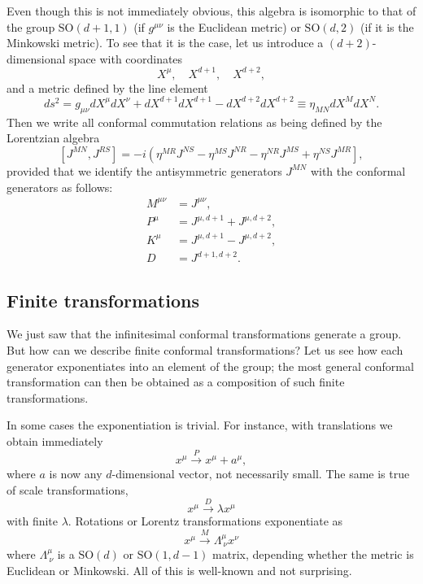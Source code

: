 \documentclass[a4paper,12pt]{article}
\numberwithin{equation}{section}
\begin{document}
Even though this is not immediately obvious, this algebra is isomorphic to that of the group $\text{SO}(d+1, 1)$ (if $g^{\mu\nu}$ is the Euclidean metric) or $\text{SO}(d, 2)$ (if it is the Minkowski metric).
To see that it is the case, let us introduce a $(d + 2)$-dimensional space with coordinates
\begin{equation}
	X^\mu, \quad X^{d+1}, \quad X^{d+2},
\end{equation}
and a metric defined by the line element
\begin{equation}
	ds^2 = g_{\mu\nu} dX^\mu dX^\nu + dX^{d+1} dX^{d+1}
	- dX^{d+2} dX^{d+2}
	\equiv \eta_{MN} dX^M dX^N.
\end{equation}
Then we write all conformal commutation relations as being defined by the Lorentzian algebra
\begin{equation}
	\left[ J^{MN}, J^{RS} \right]
	= -i \left( \eta^{MR} J^{NS} - \eta^{MS} J^{NR}
	- \eta^{NR} J^{MS} + \eta^{NS} J^{MR} \right],
\end{equation}
provided that we identify the antisymmetric generators $J^{MN}$ with the conformal generators as follows:
\begin{equation}
\begin{aligned}
	M^{\mu\nu} &= J^{\mu\nu},
	\\
	P^\mu &= J^{\mu, d+1} + J^{\mu, d+2},
	\\
	K^\mu &= J^{\mu, d+1} - J^{\mu, d+2},
	\\
	D &= J^{d+1, d+2}.
\end{aligned}
\end{equation}


\subsection{Finite transformations}

We just saw that the infinitesimal conformal transformations generate a group. But how can we describe finite conformal transformations? Let us see how each generator exponentiates into an element of the group; the most general conformal transformation can then be obtained as a composition of such finite transformations.

In some cases the exponentiation is trivial. For instance, with translations we obtain immediately
\begin{equation}
	x^\mu \xrightarrow{P} x^\mu + a^\mu,
\end{equation}
where $a$ is now any $d$-dimensional vector, not necessarily small.
The same is true of scale transformations,
\begin{equation}
	x^\mu \xrightarrow{D} \lambda x^\mu
\end{equation}
with finite $\lambda$.
Rotations or Lorentz transformations exponentiate as
\begin{equation}
	x^\mu \xrightarrow{M} \Lambda^\mu_{~\nu} x^\nu
\end{equation}
where $\Lambda^\mu_{~\nu}$ is a $\text{SO}(d)$ or $\text{SO}(1, d-1)$ matrix, depending whether the metric is Euclidean or Minkowski.
All of this is well-known and not surprising.
\end{document}
